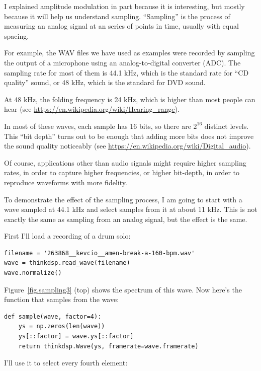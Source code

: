 \documentclass[12pt]{book}
\begin{document}
I explained amplitude modulation in part because it is interesting, but
mostly because it will help us understand sampling.  ``Sampling'' is
the process of measuring an analog signal at an series of points in
time, usually with equal spacing.

For example, the WAV files we have used as examples were
recorded by sampling the output of a microphone using an analog-to-digital
converter (ADC).  The sampling rate for most of them is 44.1 kHz,
which is the standard rate for ``CD quality'' sound, or 48 kHz, which
is the standard for DVD sound.

At 48 kHz, the folding frequency is 24 kHz, which is higher than most
people can hear (see \url{https://en.wikipedia.org/wiki/Hearing_range}).

In most of these waves, each sample has 16 bits, so there
are $2^{16}$ distinct levels.  This ``bit depth'' turns out to be enough
that adding more bits does not improve the sound quality noticeably
(see \url{https://en.wikipedia.org/wiki/Digital_audio}).

Of course, applications other than audio signals might require higher
sampling rates, in order to capture higher frequencies, or higher
bit-depth, in order to reproduce waveforms with more fidelity.


To demonstrate the effect of the sampling process, I am going to start
with a wave sampled at 44.1 kHz and select samples from it at about 11 kHz.
This is not exactly the same as sampling from an analog signal, but
the effect is the same.

First I'll load a recording of a drum solo:

\begin{verbatim}
filename = '263868__kevcio__amen-break-a-160-bpm.wav'
wave = thinkdsp.read_wave(filename)
wave.normalize()
\end{verbatim}

Figure~\ref{fig.sampling3} (top) shows the spectrum of this wave.
Now here's the function that samples from the wave:

\begin{verbatim}
def sample(wave, factor=4):
    ys = np.zeros(len(wave))
    ys[::factor] = wave.ys[::factor]
    return thinkdsp.Wave(ys, framerate=wave.framerate)
\end{verbatim}

I'll use it to select every fourth element:
\end{document}
